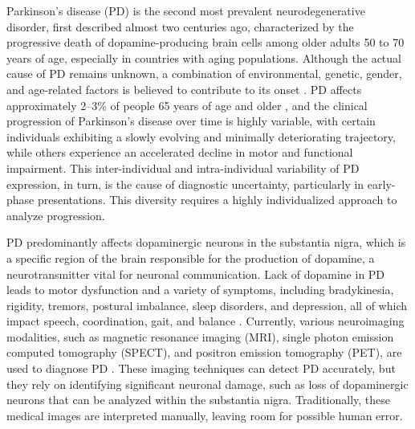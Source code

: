 \documentclass{article}
\begin{document}
Parkinson's disease (PD) is the second most prevalent neurodegenerative disorder, first described almost two centuries ago, characterized by the progressive death of dopamine-producing brain cells among older adults 50 to 70 years of age, especially in countries with aging populations. Although the actual cause of PD remains unknown, a combination of environmental, genetic, gender, and age-related factors is believed to contribute to its onset \cite{DBLP:journals/fgcs/AbdulhayNNVV18}. PD affects approximately 2–3\% of people 65 years of age and older \cite{lundervold2019overview}, and the clinical progression of Parkinson's disease over time is highly variable, with certain individuals exhibiting a slowly evolving and minimally deteriorating trajectory, while others experience an accelerated decline in motor and functional impairment. This inter-individual and intra-individual variability of PD expression, in turn, is the cause of diagnostic uncertainty, particularly in early-phase presentations. This diversity requires a highly individualized approach to analyze progression.




PD predominantly affects dopaminergic neurons in the substantia nigra, which is a specific region of the brain responsible for the production of dopamine, a neurotransmitter vital for neuronal communication. Lack of dopamine in PD leads to motor dysfunction and a variety of symptoms, including bradykinesia, rigidity, tremors, postural imbalance, sleep disorders, and depression, all of which impact speech, coordination, gait, and balance \cite{majhi2024improved}. Currently, various neuroimaging modalities, such as magnetic resonance imaging (MRI), single photon emission computed tomography (SPECT), and positron emission tomography (PET), are used to diagnose PD \cite{hirschauer2015computer, suwijn2015diagnostic, adeli2017kernel, khachnaoui2020machine}. These imaging techniques can detect PD accurately, but they rely on identifying significant neuronal damage, such as loss of dopaminergic neurons that can be analyzed within the substantia nigra. Traditionally, these medical images are interpreted manually, leaving room for possible human error.
\end{document}
